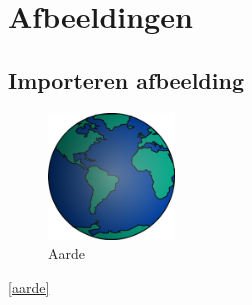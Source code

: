 \chapter{Afbeeldingen}
\label{afbeeldingen}

\section{Importeren afbeelding}

\blindtext

\begin{figure}[h!]
	\centering
	\includegraphics[width=0.3\textwidth]{boek-bestanden/aarde}
	\caption{Aarde}
	\label{aarde}
\end{figure}

\blindtext

\autoref{aarde}